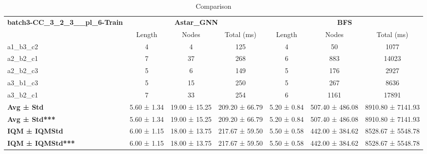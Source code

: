 \begin{table}[!ht]
\centering
\small
\begin{tabular}{l|ccc|ccc}
\multirow{2}{*}{\textbf{batch3-CC\_3\_2\_3\_\_pl\_6-Train}} & \multicolumn{3}{c|}{\textbf{Astar\_GNN}} & \multicolumn{3}{c}{\textbf{BFS}} \\
\cline{2-7}
& Length & Nodes & Total (ms) & Length & Nodes & Total (ms) \\
\hline
a1\_b3\_c2 & 4 & 4 & 125 & 4 & 50 & 1077 \\
a2\_b2\_c1 & 7 & 37 & 268 & 6 & 883 & 14023 \\
a2\_b2\_c3 & 5 & 6 & 149 & 5 & 176 & 2927 \\
a3\_b1\_c3 & 5 & 15 & 250 & 5 & 267 & 8636 \\
a3\_b2\_c1 & 7 & 33 & 254 & 6 & 1161 & 17891 \\
\hline
\textbf{Avg ± Std} & 5.60 ± 1.34 & 19.00 ± 15.25 & 209.20 ± 66.79 & 5.20 ± 0.84 & 507.40 ± 486.08 & 8910.80 ± 7141.93 \\
\textbf{Avg ± Std***} & 5.60 ± 1.34 & 19.00 ± 15.25 & 209.20 ± 66.79 & 5.20 ± 0.84 & 507.40 ± 486.08 & 8910.80 ± 7141.93 \\
\textbf{IQM ± IQMStd} & 6.00 ± 1.15 & 18.00 ± 13.75 & 217.67 ± 59.50 & 5.50 ± 0.58 & 442.00 ± 384.62 & 8528.67 ± 5548.78 \\
\textbf{IQM ± IQMStd***} & 6.00 ± 1.15 & 18.00 ± 13.75 & 217.67 ± 59.50 & 5.50 ± 0.58 & 442.00 ± 384.62 & 8528.67 ± 5548.78 \\
\end{tabular}
\caption{Comparison}
\label{tab:batch3_CC_3_2_3__pl_6_comparison_train}
\end{table}
